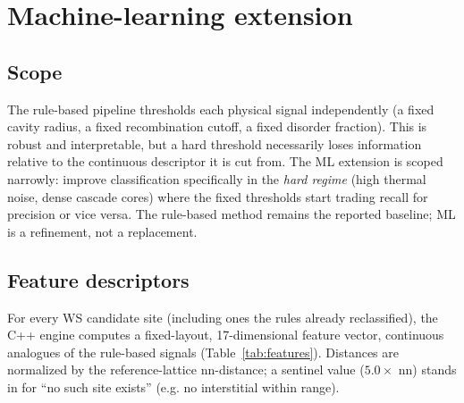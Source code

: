 \documentclass[11pt]{article}
\begin{document}
\section{Machine-learning extension}

\subsection{Scope}

The rule-based pipeline thresholds each physical signal independently (a fixed cavity radius, a
fixed recombination cutoff, a fixed disorder fraction). This is robust and interpretable, but a
hard threshold necessarily loses information relative to the continuous descriptor it is cut from.
The ML extension is scoped narrowly: improve classification specifically in the
\emph{hard regime} (high thermal noise, dense cascade cores) where the fixed thresholds start
trading recall for precision or vice versa. The rule-based method remains the reported baseline;
ML is a refinement, not a replacement.

\subsection{Feature descriptors}

For every WS candidate site (including ones the rules already reclassified), the C++ engine
computes a fixed-layout, 17-dimensional feature vector, continuous analogues of the rule-based
signals (Table~\ref{tab:features}). Distances are normalized by the reference-lattice nn-distance;
a sentinel value ($5.0\times$ nn) stands in for ``no such site exists'' (e.g. no interstitial within
range).
\end{document}
